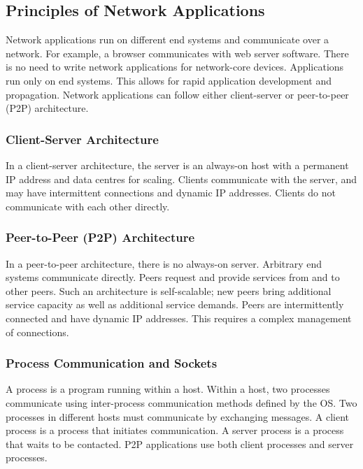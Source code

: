 \subsection{Principles of Network Applications}

Network applications run on different end systems and communicate over a network.
For example, a browser communicates with web server software.
There is no need to write network applications for network-core devices.
Applications run only on end systems.
This allows for rapid application development and propagation.
Network applications can follow either client-server or peer-to-peer (P2P) architecture.

\subsubsection{Client-Server Architecture}

In a client-server architecture, the server is an always-on host with a permanent IP address and data centres for scaling.
Clients communicate with the server, and may have intermittent connections and dynamic IP addresses.
Clients do not communicate with each other directly.

\subsubsection{Peer-to-Peer (P2P) Architecture}

In a peer-to-peer architecture, there is no always-on server.
Arbitrary end systems communicate directly.
Peers request and provide services from and to other peers.
Such an architecture is self-scalable; new peers bring additional service capacity as well as additional service demands.
Peers are intermittently connected and have dynamic IP addresses.
This requires a complex management of connections.

\subsubsection{Process Communication and Sockets}

A process is a program running within a host.
Within a host, two processes communicate using inter-process communication methods defined by the OS\@.
Two processes in different hosts must communicate by exchanging messages.
A client process is a process that initiates communication.
A server process is a process that waits to be contacted.
P2P applications use both client processes and server processes.

